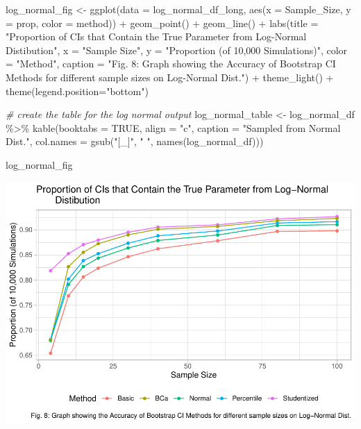 \documentclass[12pt]{article}
\newenvironment{Shaded}{\begin{snugshade}}{\end{snugshade}}
\newcommand{\AttributeTok}[1]{\textcolor[rgb]{0.77,0.63,0.00}{#1}}
\newcommand{\CommentTok}[1]{\textcolor[rgb]{0.56,0.35,0.01}{\textit{#1}}}
\newcommand{\ConstantTok}[1]{\textcolor[rgb]{0.00,0.00,0.00}{#1}}
\newcommand{\FunctionTok}[1]{\textcolor[rgb]{0.00,0.00,0.00}{#1}}
\newcommand{\NormalTok}[1]{#1}
\newcommand{\OtherTok}[1]{\textcolor[rgb]{0.56,0.35,0.01}{#1}}
\newcommand{\SpecialCharTok}[1]{\textcolor[rgb]{0.00,0.00,0.00}{#1}}
\newcommand{\StringTok}[1]{\textcolor[rgb]{0.31,0.60,0.02}{#1}}
\begin{document}
\begin{Shaded}
\begin{Highlighting}[]
\NormalTok{log\_normal\_fig }\OtherTok{\textless{}{-}} \FunctionTok{ggplot}\NormalTok{(}\AttributeTok{data =}\NormalTok{ log\_normal\_df\_long, }
                    \FunctionTok{aes}\NormalTok{(}\AttributeTok{x =}\NormalTok{ Sample\_Size, }\AttributeTok{y =}\NormalTok{ prop, }\AttributeTok{color =}\NormalTok{ method)) }\SpecialCharTok{+} 
  \FunctionTok{geom\_point}\NormalTok{() }\SpecialCharTok{+} \FunctionTok{geom\_line}\NormalTok{() }\SpecialCharTok{+} 
  \FunctionTok{labs}\NormalTok{(}\AttributeTok{title =} \StringTok{"Proportion of CIs that Contain the True Parameter from Log{-}Normal }
\StringTok{       Distibution"}\NormalTok{, }\AttributeTok{x =} \StringTok{"Sample Size"}\NormalTok{, }
       \AttributeTok{y =} \StringTok{"Proportion (of 10,000 Simulations)"}\NormalTok{, }\AttributeTok{color =} \StringTok{"Method"}\NormalTok{,}
       \AttributeTok{caption =} \StringTok{"Fig. 8: Graph showing the Accuracy of Bootstrap CI Methods for different sample sizes on Log{-}Normal Dist."}\NormalTok{) }\SpecialCharTok{+}
  \FunctionTok{theme\_light}\NormalTok{() }\SpecialCharTok{+}
  \FunctionTok{theme}\NormalTok{(}\AttributeTok{legend.position=}\StringTok{"bottom"}\NormalTok{)}

\CommentTok{\# create the table for the log normal output}
\NormalTok{log\_normal\_table }\OtherTok{\textless{}{-}}\NormalTok{ log\_normal\_df }\SpecialCharTok{\%\textgreater{}\%}
  \FunctionTok{kable}\NormalTok{(}\AttributeTok{booktabs =} \ConstantTok{TRUE}\NormalTok{, }\AttributeTok{align =} \StringTok{"c"}\NormalTok{, }\AttributeTok{caption =} \StringTok{"Sampled from Normal Dist."}\NormalTok{, }
        \AttributeTok{col.names =} \FunctionTok{gsub}\NormalTok{(}\StringTok{"[\_]"}\NormalTok{, }\StringTok{" "}\NormalTok{, }\FunctionTok{names}\NormalTok{(log\_normal\_df)))}
\end{Highlighting}
\end{Shaded}

\begin{Shaded}
\begin{Highlighting}[]
\NormalTok{log\_normal\_fig}
\end{Highlighting}
\end{Shaded}

\includegraphics{paper_files/figure-latex/output the graphs/tables-1.pdf}
\end{document}
